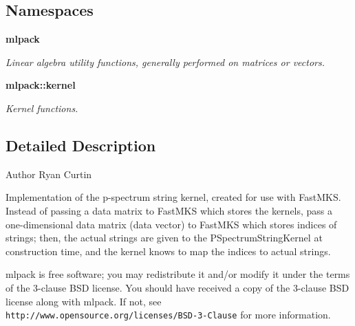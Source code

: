 \subsection*{Namespaces}
\begin{DoxyCompactItemize}
\item 
 \textbf{ mlpack}
\begin{DoxyCompactList}\small\item\em Linear algebra utility functions, generally performed on matrices or vectors. \end{DoxyCompactList}\item 
 \textbf{ mlpack\+::kernel}
\begin{DoxyCompactList}\small\item\em Kernel functions. \end{DoxyCompactList}\end{DoxyCompactItemize}


\subsection{Detailed Description}
\begin{DoxyAuthor}{Author}
Ryan Curtin
\end{DoxyAuthor}
Implementation of the p-\/spectrum string kernel, created for use with Fast\+M\+KS. Instead of passing a data matrix to Fast\+M\+KS which stores the kernels, pass a one-\/dimensional data matrix (data vector) to Fast\+M\+KS which stores indices of strings; then, the actual strings are given to the P\+Spectrum\+String\+Kernel at construction time, and the kernel knows to map the indices to actual strings.

mlpack is free software; you may redistribute it and/or modify it under the terms of the 3-\/clause B\+SD license. You should have received a copy of the 3-\/clause B\+SD license along with mlpack. If not, see {\tt http\+://www.\+opensource.\+org/licenses/\+B\+S\+D-\/3-\/\+Clause} for more information. 